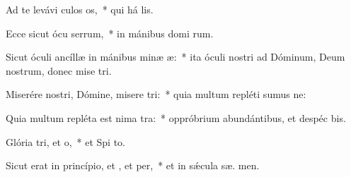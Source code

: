 \item Ad te levávi culos os,~* qui há  lis.
\item Ecce sicut ócu serrum,~* in mánibus domi rum.
\item Sicut óculi ancíllæ in mánibus minæ æ:~* ita óculi nostri ad Dóminum, Deum nostrum, donec mise tri.
\item Miserére nostri, Dómine, misere tri:~* quia multum repléti sumus ne:
\item Quia multum repléta est nima tra:~* oppróbrium abundántibus, et despéc bis.
\item Glória tri, et o,~* et Spi to.
\item Sicut erat in princípio, et , et per,~* et in sǽcula sæ. men.
